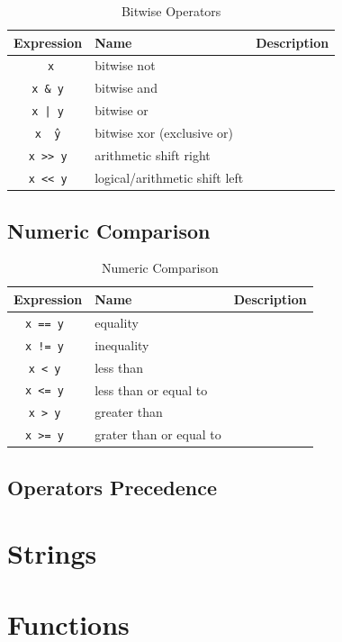 \documentclass[11pt]{article} %
\begin{document}
\begin{table}[H]
\begin{tabular}{ c l l }
	\toprule
	{\bf Expression} & {\bf Name}  & {\bf Description} \\
	\midrule 
	{\tt ~x} & bitwise not & \\
	{\tt x \& y} & bitwise and &  \\
	{\tt x | y} & bitwise or &  \\
	{\tt x \^\ y} & bitwise xor (exclusive or) &  \\
	{\tt x >> y} & arithmetic shift right &  \\
	{\tt x << y} & logical/arithmetic shift left&  \\
	\bottomrule
\end{tabular}
\centering
\caption{Bitwise Operators}
\label{tab:operators}
\end{table} 

\subsection{Numeric Comparison}

\begin{table}[H]
\begin{tabular}{ c l l }
	\toprule
	{\bf Expression} & {\bf Name}  & {\bf Description} \\
	\midrule 
	{\tt x == y } & equality & \\
	{\tt x != y } & inequality &  \\
	{\tt x < y } & less than &  \\
	{\tt x <= y } & less than or equal to &  \\
	{\tt x > y } & greater than &  \\
	{\tt x >= y } & grater than or equal to &  \\
	\bottomrule
\end{tabular}
\centering
\caption{Numeric Comparison}
\label{tab:operators}
\end{table} 

\subsection{Operators Precedence}

\section {Strings}

\section {Functions}
\end{document}
